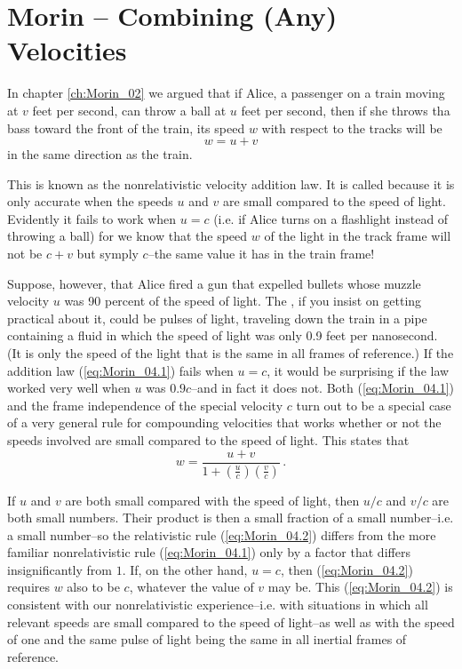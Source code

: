\chapter{Morin -- Combining (Any) Velocities}
\label{ch:Morin_04}

In chapter \ref{ch:Morin_02} we argued that if Alice, a passenger on a train moving at $v$ feet per second, can throw a ball at $u$ feet per second, then if she throws tha bass toward the front of the train, its speed $w$ with respect to the tracks will be 
\begin{equation}\label{eq:Morin_04.1}
w = u + v
\end{equation}
in the same direction as the train.

This is known as the nonrelativistic velocity addition law. It is called  because it is only accurate when the speeds $u$ and $v$ are small compared to the speed of light. Evidently it fails to work when $u = c$ (i.e. if Alice turns on a flashlight instead of throwing a ball) for we know that the speed $w$ of the light in the track frame will not be $c + v$ but symply $c$--the same value it has in the train frame!

Suppose, however, that Alice fired a gun that expelled bullets whose muzzle velocity $u$ was 90 percent of the speed of light. The , if you insist on getting practical about it, could be pulses of light, traveling down the train in a pipe containing a fluid in which the speed of light was only 0.9 feet per nanosecond. (It is only the speed of the light  that is the same in all frames of reference.) If the addition law (\ref{eq:Morin_04.1}) fails when $u = c$, it would be surprising if the law worked very well when $u$ was $0.9c$--and in fact it does not. Both (\ref{eq:Morin_04.1}) and the frame independence of the special velocity $c$ turn out to be a special case of a very general rule for compounding velocities that works whether or not the speeds involved are small compared to the speed of light. This  states that
\begin{equation}\label{eq:Morin_04.2}
w = \frac{u + v}{1 + \left( \frac{u}{c}\right) \left( \frac{v}{c}\right)}\,.
\end{equation}

If $u$ and $v$ are both small compared with the speed of light, then $u/c$ and $v/c$ are both small numbers. Their product is then a small fraction of a small number--i.e. a  small number--so the relativistic rule (\ref{eq:Morin_04.2}) differs from the more familiar nonrelativistic rule (\ref{eq:Morin_04.1}) only by a factor that differs insignificantly from $1$. If, on the other hand, $u = c$, then (\ref{eq:Morin_04.2}) requires $w$ also to be $c$, whatever the value of $v$ may be. This (\ref{eq:Morin_04.2}) is consistent with our nonrelativistic experience--i.e. with situations in which all relevant speeds are small compared to the speed of light--as well as with the speed of one and the same pulse of light being the same in all inertial frames of reference.


